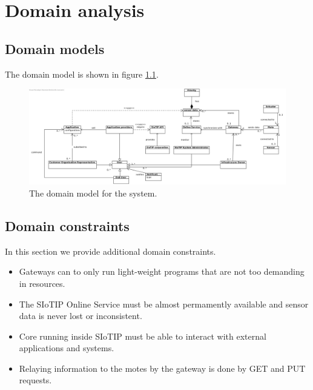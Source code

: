 \documentclass[english]{sareport}
\begin{document}
\maketitle

\tableofcontents

\chapter{Domain analysis}\label{sec:domain}
\section{Domain models}
The domain model is shown in figure \ref{fig:domain_model}.

\begin{figure}
    \centering
    \includegraphics[width=1.05\textwidth]{Class_Diagram1.jpg}
    \caption{The domain model for the system.}\label{fig:domain_model}
\end{figure}

\section{Domain constraints}
In this section we provide additional domain constraints.

\begin{itemize}
    \item Gateways can to only run light-weight programs that are not too
          demanding in resources.
    \item The SIoTIP Online Service must be almost permamently available and sensor
          data is never lost or inconsistent.
    \item Core running inside SIoTIP must be able to interact with
          external applications and systems.
    \item Relaying information to the motes by the gateway is done by GET and PUT
          requests.
\end{itemize}
\end{document}
